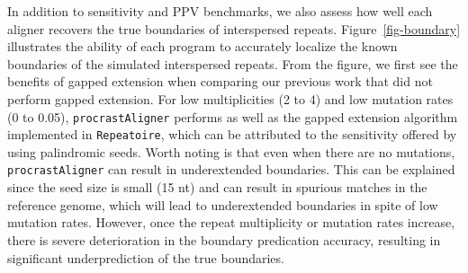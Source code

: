 \documentclass[12pt,journal,letterpaper,onecolumn, draftcls]{IEEEtran}
\begin{document}
In addition to sensitivity and PPV benchmarks, we also assess how well
each aligner recovers the true boundaries of interspersed
repeats.  Figure~\ref{fig-boundary} illustrates the ability of each
program to accurately localize the known boundaries of the simulated interspersed
repeats. From the figure, we first see the benefits of gapped extension when comparing our previous work
that did not perform gapped extension. For low multiplicities (2 to 4) and low mutation rates (0 to 0.05), \texttt{procrastAligner} performs as well
as the gapped extension algorithm implemented in \texttt{Repeatoire}, which can be attributed to the sensitivity offered by using palindromic seeds. Worth noting is that even when there are no mutations, \texttt{procrastAligner} can result in underextended boundaries. This can be explained since the seed size is small (15 nt) and can result in spurious matches in the reference genome, which will lead to underextended boundaries in spite of low mutation rates. However, once the repeat multiplicity or mutation rates increase, there is severe deterioration in the boundary predication accuracy, resulting in significant underprediction of the true boundaries.
\end{document}
